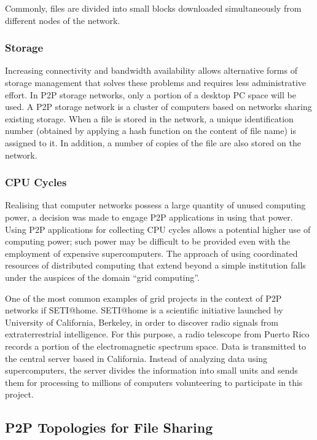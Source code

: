 Commonly, files are divided into small blocks downloaded simultaneously from
different nodes of the network.

\subsubsection{Storage}

Increasing connectivity and bandwidth availability allows alternative forms of
storage management that solves these problems and requires less administrative
effort. In P2P storage networks, only a portion of a desktop PC space will be
used. A P2P storage network is a cluster of computers based on networks sharing
existing storage. When a file is stored in the network, a unique identification
number (obtained by applying a hash function on the content of file name) is
assigned to it. In addition, a number of copies of the file are also stored on
the network.

\subsubsection{CPU Cycles}

Realising that computer networks possess a large quantity of unused computing
power, a decision was made to engage P2P applications in using that power.
Using P2P applications for collecting CPU cycles allows a potential higher use
of computing power; such power may be difficult to be provided even with the
employment of expensive supercomputers. The approach of using coordinated
resources of distributed computing that extend beyond a simple institution
falls under the auspices of the domain ``grid computing''.

One of the most common examples of grid projects in the context of P2P networks
if SETI@home. SETI@home is a scientific initiative launched by University of
California, Berkeley, in order to discover radio signals from extraterrestrial
intelligence. For this purpose, a radio telescope from Puerto Rico records a
portion of the electromagnetic spectrum space. Data is transmitted to the
central server based in California. Instead of analyzing data using
supercomputers, the server divides the information into small units and sends
them for processing to millions of computers volunteering to participate in
this project.

\subsection{P2P Topologies for File Sharing}

